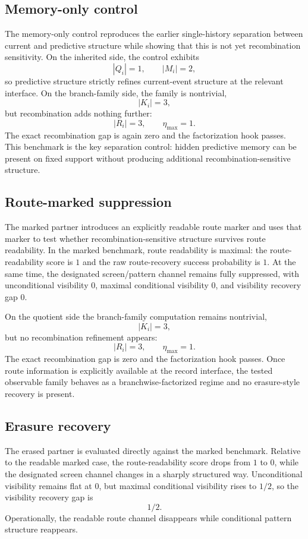 \documentclass[11pt]{article}
\theoremstyle{definition}
\begin{document}
\subsection{Memory-only control}

The memory-only control reproduces the earlier single-history separation between current and predictive structure while showing that this is not yet recombination sensitivity. On the inherited side, the control exhibits
\[
|Q_i| = 1, \qquad |M_i| = 2,
\]
so predictive structure strictly refines current-event structure at the relevant interface. On the branch-family side, the family is nontrivial,
\[
|K_i| = 3,
\]
but recombination adds nothing further:
\[
|R_i| = 3, \qquad \eta_{\max} = 1.
\]
The exact recombination gap is again zero and the factorization hook passes. This benchmark is the key separation control: hidden predictive memory can be present on fixed support without producing additional recombination-sensitive structure.

\subsection{Route-marked suppression}

The marked partner introduces an explicitly readable route marker and uses that marker to test whether recombination-sensitive structure survives route readability. In the marked benchmark, route readability is maximal: the route-readability score is \(1\) and the raw route-recovery success probability is \(1\). At the same time, the designated screen/pattern channel remains fully suppressed, with unconditional visibility \(0\), maximal conditional visibility \(0\), and visibility recovery gap \(0\).

On the quotient side the branch-family computation remains nontrivial,
\[
|K_i| = 3,
\]
but no recombination refinement appears:
\[
|R_i| = 3, \qquad \eta_{\max} = 1.
\]
The exact recombination gap is zero and the factorization hook passes. Once route information is explicitly available at the record interface, the tested observable family behaves as a branchwise-factorized regime and no erasure-style recovery is present.

\subsection{Erasure recovery}

The erased partner is evaluated directly against the marked benchmark. Relative to the readable marked case, the route-readability score drops from \(1\) to \(0\), while the designated screen channel changes in a sharply structured way. Unconditional visibility remains flat at \(0\), but maximal conditional visibility rises to \(1/2\), so the visibility recovery gap is
\[
1/2.
\]
Operationally, the readable route channel disappears while conditional pattern structure reappears.
\end{document}
